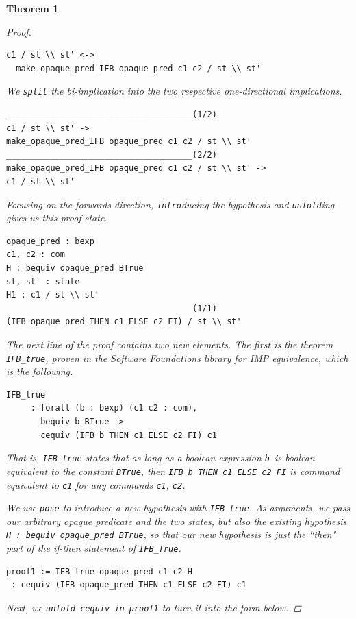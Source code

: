 \documentclass[12pt,notitlepage]{report}
\theoremstyle{plain}
\newtheorem{theo}{Theorem}[section]
\theoremstyle{definition}
\numberwithin{equation}{section}
\begin{document}
\begin{theo}
\begin{proof}
\begin{verbatim}
c1 / st \\ st' <->
  make_opaque_pred_IFB opaque_pred c1 c2 / st \\ st'
\end{verbatim}
We \verb$split$ the bi-implication into the two respective one-directional implications.  
\begin{verbatim}
______________________________________(1/2)
c1 / st \\ st' ->
make_opaque_pred_IFB opaque_pred c1 c2 / st \\ st'
______________________________________(2/2)
make_opaque_pred_IFB opaque_pred c1 c2 / st \\ st' ->
c1 / st \\ st'
\end{verbatim}
Focusing on the forwards direction, \verb$intro$ducing the hypothesis and \verb$unfold$ing gives us this proof state.
\begin{verbatim}
opaque_pred : bexp
c1, c2 : com
H : bequiv opaque_pred BTrue
st, st' : state
H1 : c1 / st \\ st'
______________________________________(1/1)
(IFB opaque_pred THEN c1 ELSE c2 FI) / st \\ st'
\end{verbatim}
The next line of the proof contains two new elements.  The first is the theorem \verb$IFB_true$, proven in the Software Foundations library for IMP equivalence, which is the following.
\begin{verbatim}
IFB_true
     : forall (b : bexp) (c1 c2 : com),
       bequiv b BTrue ->
       cequiv (IFB b THEN c1 ELSE c2 FI) c1 
\end{verbatim}
That is, \verb$IFB_true$ states that as long as a boolean expression \verb$b $is boolean equivalent to the constant \verb$BTrue$, then \verb$IFB b THEN c1 ELSE c2 FI$ is command equivalent to \verb$c1$ for any commands \verb$c1$, \verb$c2$.
\par We use \verb$pose$ to introduce a new hypothesis with \verb$IFB_true$.  As arguments, we pass our arbitrary opaque predicate and the two states, but also the existing hypothesis \verb$H : bequiv opaque_pred BTrue$, so that our new hypothesis is just the ``then" part of the if-then statement of \verb$IFB_True$.
\begin{verbatim}
proof1 := IFB_true opaque_pred c1 c2 H
 : cequiv (IFB opaque_pred THEN c1 ELSE c2 FI) c1
\end{verbatim}
Next, we \verb$unfold cequiv in proof1$ to turn it into the form below.

\end{proof}
\end{theo}
\end{document}
